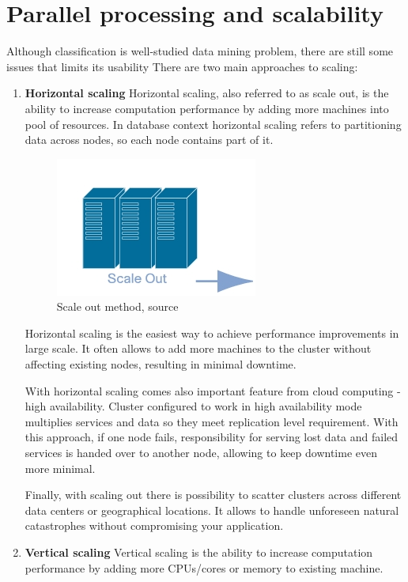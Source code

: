 \section{Parallel processing and scalability}
	Although classification is well-studied data mining problem, there are still some issues that limits its usability 
	There are two main approaches to scaling:
	\begin{enumerate}
		\item \textbf{Horizontal scaling}
		Horizontal scaling, also referred to as scale out, is the ability to increase computation performance by adding more machines into pool of resources. In database context horizontal scaling refers to partitioning data across nodes, so each node contains part of it.
		
		\begin{figure}[H]
			\begin{center}
				\includegraphics[width=0.3\linewidth]{images/scaleout.png}
				\caption{Scale out method, source \cite{scale_out_up} }
				\label{svm-plot2}
			\end{center}
		\end{figure}
		
		Horizontal scaling is the easiest way to achieve performance improvements in large scale. It often allows to add more machines to the cluster without affecting existing nodes, resulting in minimal downtime.
		
		With horizontal scaling comes also important feature from cloud computing - high availability. Cluster configured to work in high availability mode multiplies services and data so they meet replication level requirement. With this approach, if one node fails, responsibility for serving lost data and failed services is handed over to another node, allowing to keep downtime even more minimal.
		
		Finally, with scaling out there is possibility to scatter clusters across different data centers or geographical locations. It allows to handle unforeseen natural catastrophes without compromising your application.
		
		\item \textbf{Vertical scaling}
		Vertical scaling is the ability to increase computation performance by adding more CPUs/cores or memory to existing machine.
		

\end{enumerate}
